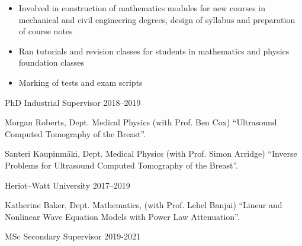 \documentclass[11pt, a4paper]{awesome-cv}
\begin{document}
\begin{cventries}
{\begin{itemize}[leftmargin=2ex, nosep, noitemsep]
\setlength{\parskip}{0pt}
\item Involved in construction of mathematics modules for new courses in mechanical and civil engineering degrees, design of syllabus and preparation of course notes
\item Ran tutorials and revision classes for students in mathematics and physics foundation classes
\item Marking of tests and exam scripts
\end{itemize}}
%
%
%
%
{PhD Industrial Supervisor}%
{}%
{2018--2019}%
{\begin{cvitems}%
\item Morgan Roberts, Dept. Medical Physics (with Prof. Ben Cox) \enquote{Ultrasound Computed Tomography of the Breast}. %
\item Santeri Kaupinm\"{a}ki, Dept. Medical Physics (with Prof. Simon Arridge) \enquote{Inverse Problems for Ultrasound Computed Tomography of the Breast}. %
\end{cvitems}}%
{Heriot--Watt University}%
{}%
{2017--2019}%
{\begin{cvitems}%
\item Katherine Baker, Dept. Mathematics, (with Prof. Lehel Banjai) \enquote{Linear and Nonlinear Wave Equation Models with Power Law Attenuation}.
\end{cvitems}}%
%
%
{MSc Secondary Supervisor}
{}
{2019-2021}{%
\begin{cvitems}

\end{cvitems}}
\end{cventries}
\end{document}
